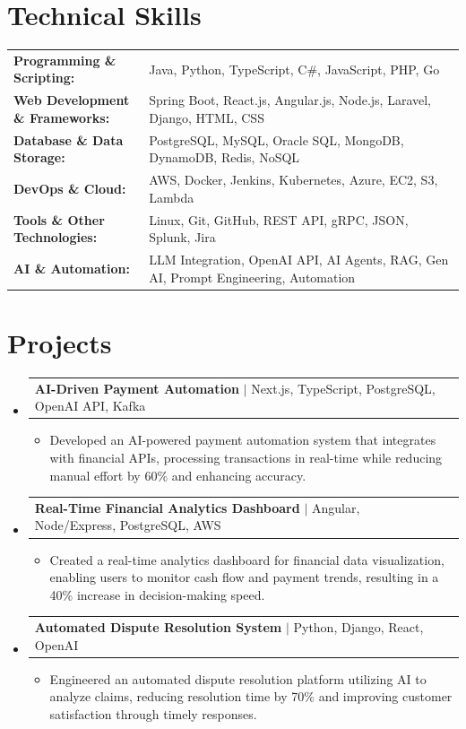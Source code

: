 \documentclass[letterpaper,10pt]{article}
\makeatletter
\newcommand{\resumeItem}[1]{
  \item{\fontsize{8pt}{9pt}\selectfont
    #1 \vspace{-3pt}
  }
}
\newcommand{\resumeProjectHeading}[2]{
    \item
    \begin{tabular*}{1.001\textwidth}{l@{\extracolsep{\fill}}r}
      \fontsize{8.5pt}{10pt}#1 & \textbf{\fontsize{8.5pt}{10pt} #2}\\
    \end{tabular*}\vspace{-7pt}
}
\newcommand{\resumeSubHeadingListStart}{\begin{itemize}[leftmargin=0pt, label={}]}
\newcommand{\resumeSubHeadingListEnd}{\end{itemize}}
\newcommand{\resumeItemListStart}{\begin{itemize}[leftmargin=*]}
\newcommand{\resumeItemListEnd}{\end{itemize}\vspace{-5pt}}
\makeatother
\begin{document}
\section{Technical Skills}
        \vspace{-14pt}
        \begin{table}[h]
            \fontsize{8pt}{9pt}\selectfont
            \begin{tabular}{p{0.3\linewidth} p{0.7\linewidth}}
                \textbf{Programming \& Scripting:} & Java, Python, TypeScript, C\#, JavaScript, PHP, Go \\
                \textbf{Web Development \& Frameworks:} & Spring Boot, React.js, Angular.js, Node.js, Laravel, Django, HTML, CSS \\
                \textbf{Database \& Data Storage:} & PostgreSQL, MySQL, Oracle SQL, MongoDB, DynamoDB, Redis, NoSQL \\
                \textbf{DevOps \& Cloud:} & AWS, Docker, Jenkins, Kubernetes, Azure, EC2, S3, Lambda \\
                \textbf{Tools \& Other Technologies:} & Linux, Git, GitHub, REST API, gRPC, JSON, Splunk, Jira \\
                \textbf{AI \& Automation:} & LLM Integration, OpenAI API, AI Agents, RAG, Gen AI, Prompt Engineering, Automation \\
            \end{tabular}
        \end{table}
 \vspace{-18pt}

\section{Projects}
    \vspace{-5pt}
    \resumeSubHeadingListStart
          \resumeProjectHeading
            {\textbf{AI-Driven Payment Automation} $|$ Next.js, TypeScript, PostgreSQL, OpenAI API, Kafka}{}
            \resumeItemListStart
                \resumeItem{Developed an AI-powered payment automation system that integrates with financial APIs, processing transactions in real-time while reducing manual effort by 60\% and enhancing accuracy.}
            \resumeItemListEnd
        \vspace{-12pt}
    
        \resumeProjectHeading
            {\textbf{Real-Time Financial Analytics Dashboard} $|$ Angular, Node/Express, PostgreSQL, AWS}{}
        \resumeItemListStart
                \resumeItem{Created a real-time analytics dashboard for financial data visualization, enabling users to monitor cash flow and payment trends, resulting in a 40\% increase in decision-making speed.}
        \resumeItemListEnd
      \vspace{-12pt}
      \resumeProjectHeading
        {\textbf{Automated Dispute Resolution System} $|$ Python, Django, React, OpenAI}{}
    \resumeItemListStart
            \resumeItem{Engineered an automated dispute resolution platform utilizing AI to analyze claims, reducing resolution time by 70\% and improving customer satisfaction through timely responses.}
    \resumeItemListEnd
    \resumeSubHeadingListEnd
\end{document}

